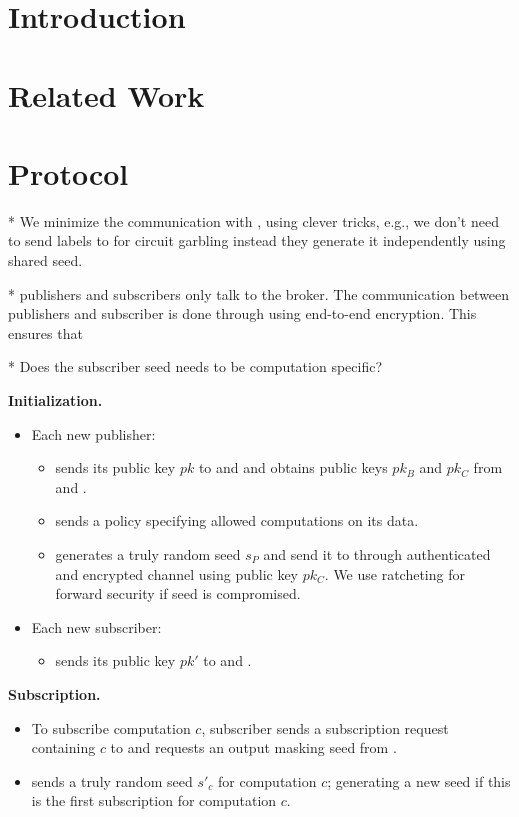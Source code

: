\section{Introduction}

\section{Related Work}

\section{Protocol}

* We minimize the communication with \garbler, using clever tricks, e.g.,
we don't need to send labels to \garbler for circuit garbling instead they
generate it independently using shared seed.

* publishers and subscribers only talk to the broker. The communication
between publishers and subscriber is done through \broker using end-to-end
encryption. This ensures that 

* Does the subscriber seed needs to be computation specific?

\noindent\textbf{Initialization.}
\begin{itemize}[leftmargin=*]
 
  \item Each new publisher: 
		\begin{itemize}
			\item sends its public key $pk$ to \broker and \garbler and obtains
		  public keys $pk_B$ and $pk_C$ from \broker and \garbler.
			\item sends a policy specifying allowed computations on its data.
			\item generates a truly random seed $s_P$ and send it to \garbler
		  through authenticated and encrypted channel using \garbler public
		  key $pk_C$. We use ratcheting for forward security if seed is
		  compromised.
		\end{itemize} 

	\item Each new subscriber:
		\begin{itemize}
			 \item sends its public key $pk'$ to \broker and \garbler.
		\end{itemize}

\end{itemize}

\noindent\textbf{Subscription.}
\begin{itemize}[leftmargin=*]

	\item To subscribe computation $c$, subscriber sends a subscription request
	  containing $c$ to \broker and requests an output masking seed from
	  \garbler.  
	\item \garbler sends a truly random seed $s'_c$ for computation $c$;
	  generating a new seed if this is the first subscription for computation
	  $c$. 
\end{itemize}

